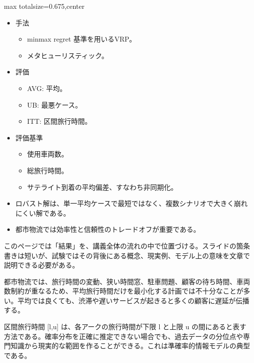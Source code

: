 \clearpage
{}
\begin{adjustbox}{max totalsize={\textwidth}{0.675\textheight},center}
\begin{minipage}{\textwidth}\scriptsize
\begin{minipage}[t]{0.485\textwidth}
\begin{itemize}
\item 手法
\begin{itemize}
\item minmax regret 基準を用いるVRP。
\item メタヒューリスティック。
\end{itemize}
\item 評価
\begin{itemize}
\item AVG: 平均。
\item UB: 最悪ケース。
\item ITT: 区間旅行時間。
\end{itemize}
\item 評価基準
\begin{itemize}
\item 使用車両数。
\item 総旅行時間。
\item サテライト到着の平均偏差、すなわち非同期化。
\end{itemize}
\end{itemize}
\begin{itemize}
\item ロバスト解は、単一平均ケースで最短ではなく、複数シナリオで大きく崩れにくい解である。
\item 都市物流では効率性と信頼性のトレードオフが重要である。
\end{itemize}
\end{minipage}\hfill
\begin{minipage}[t]{0.485\textwidth}
このページでは「結果」を、講義全体の流れの中で位置づける。スライドの箇条書きは短いが、試験ではその背後にある概念、現実例、モデル上の意味を文章で説明できる必要がある。\par
都市物流では、旅行時間の変動、狭い時間窓、駐車問題、顧客の待ち時間、車両数制約が重なるため、平均旅行時間だけを最小化する計画では不十分なことが多い。平均では良くても、渋滞や遅いサービスが起きると多くの顧客に遅延が伝播する。\par
区間旅行時間 [l,u] は、各アークの旅行時間が下限 l と上限 u の間にあると表す方法である。確率分布を正確に推定できない場合でも、過去データの分位点や専門知識から現実的な範囲を作ることができる。これは準確率的情報モデルの典型である。\par

\end{minipage}
\end{minipage}
\end{adjustbox}
